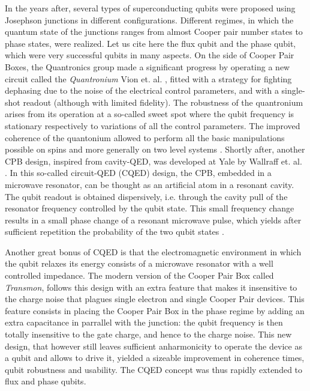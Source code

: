 \smallskip

In the years after, several types of superconducting qubits were proposed
using Josephson junctions in different configurations. Different regimes,
in which the quantum state of the junctions ranges from almost Cooper
pair number states to phase states, were realized. Let us cite here
the flux qubit \citep{mooij_josephson_1999, chiorescu_coherent_2003}
and the phase qubit\citep{martinis_rabi_2002}, which were very
successful qubits in many aspects. On the side of Cooper Pair Boxes,
the Quantronics group made a significant progress by operating a
new circuit called the \textit{Quantronium} Vion et. al. \citep{vion_manipulating_2002},
fitted with a strategy for fighting dephasing due to the noise of
the electrical control parameters, and with a single-shot
readout (although with limited fidelity). The robustness of the quantronium
arises from its operation at a so-called sweet spot where the qubit
frequency is stationary respectively to variations of all
the control parameters. The improved coherence of
the quantonium allowed to perform all the basic manipulations possible
on spins and more generally on two level systems \citep{collin_nmr-like_2004}.
Shortly after, another CPB design, inspired from
cavity-QED, was developed at Yale by Wallraff et. al. \citep{wallraff_strong_2004}.
In this so-called circuit-QED (CQED) design, the
CPB, embedded in a microwave resonator, can be thought as an artificial
atom in a resonant cavity. The qubit readout is obtained
dispersively, i.e. through the cavity pull of the resonator frequency
controlled by the qubit state. This small frequency change results
in a small phase change of a resonant microwave pulse, which yields
after sufficient repetition the probability of the two qubit states
\citep{blais_cavity_2004}.

\smallskip{}


Another great bonus of CQED is that the electromagnetic
environment in which the qubit relaxes its energy consists of a microwave
resonator with a well controlled impedance. The modern
version of the Cooper Pair Box called \textit{Transmon}, follows this
design with an extra feature that makes it insensitive to the charge
noise that plagues single electron and single Cooper Pair devices.
This feature consists in placing the Cooper Pair
Box in the phase regime by adding an extra capacitance in
parrallel with the junction: the qubit frequency is then
totally insensitive to the gate charge, and hence to the charge noise.
This new design, that however still leaves sufficient anharmonicity
to operate the device as a qubit and allows to drive it, yielded a
sizeable improvement in coherence times, qubit robustness and usability.
The CQED concept was thus rapidly extended to flux and phase qubits.

